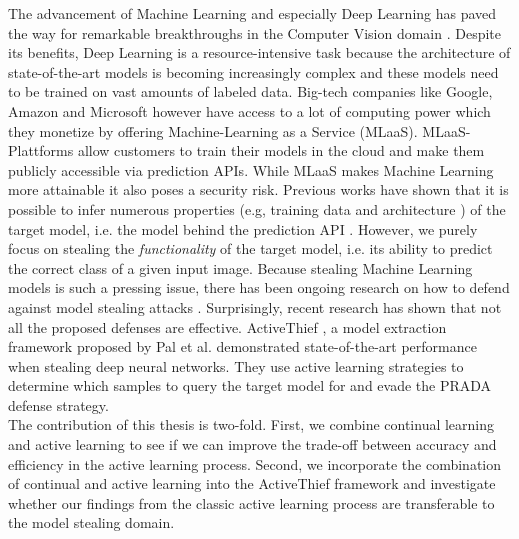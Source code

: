 
\Abstract
The advancement of Machine Learning and especially Deep Learning has paved the way for remarkable breakthroughs in the Computer Vision domain \cite{he2016deep}
 \cite{goodfellow2020generative} \cite{lecun1989backpropagation}. Despite its benefits, Deep Learning is a resource-intensive task because the architecture
  of state-of-the-art models is becoming increasingly complex and these models need to be trained on vast amounts of labeled data. Big-tech companies like Google,
 Amazon and Microsoft however have access to a lot of computing power which they monetize by offering Machine-Learning as a Service (MLaaS). MLaaS-Plattforms
allow customers to train their models in the cloud and make them publicly accessible via prediction APIs. While MLaaS makes Machine Learning more attainable
 it also poses a security risk. Previous works have shown that it is possible to infer numerous properties (e.g, training data \cite{shokri2017membership}
and architecture \cite{oh2019towards}) of the target model, i.e. the model behind the prediction API \cite{tramer2016stealing} \cite{papernot2017practical}.
However, we purely focus on stealing the \textit{functionality} of the target model, i.e. its ability to predict the correct class of a given input image.
Because stealing Machine Learning models is such a pressing issue, there has been ongoing research on how to defend against model stealing attacks
\cite{orekondy2019prediction} \cite{juuti2019prada}. Surprisingly, recent research has shown that not all the proposed defenses are effective.
ActiveThief \cite{pal2020activethief}, a model extraction framework proposed by Pal et al. demonstrated state-of-the-art performance when stealing deep neural
networks. They use active learning strategies to determine which samples to query the target model for and evade the PRADA \cite{juuti2019prada} defense strategy. \\
The contribution of this thesis is two-fold. First, we combine continual learning and active learning to see if we can improve the trade-off between accuracy and 
efficiency in the active learning process. Second, we incorporate the combination of continual and active learning into the ActiveThief framework and investigate
whether our findings from the classic active learning process are transferable to the model stealing domain.